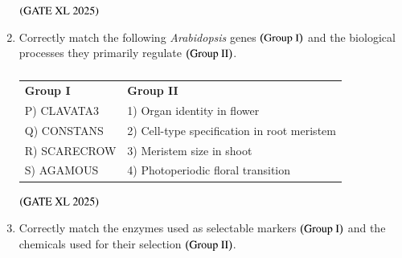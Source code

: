 \documentclass[journal]{IEEEtran}
\begin{document}
\begin{enumerate}
    \hfill $\left(\text{GATE XL 2025}\right)$
    \begin{enumerate}
    \end{enumerate}

    \item Correctly match the following \textit{Arabidopsis} genes $\left(\text{Group I}\right)$ and the biological processes they primarily regulate $\left(\text{Group II}\right)$.

    \begin{table}[H]
        \centering
        \begin{tabular}{ll}
            \textbf{Group I} & \textbf{Group II} \\
            P) CLAVATA3   & 1) Organ identity in flower \\
            Q) CONSTANS   & 2) Cell-type specification in root meristem \\
            R) SCARECROW  & 3) Meristem size in shoot \\
            S) AGAMOUS    & 4) Photoperiodic floral transition \\
        \end{tabular}
        \caption*{}
        \label{tab:xl2025_q60}
    \end{table}

    \hfill $\left(\text{GATE XL 2025}\right)$
    \begin{enumerate}
    \end{enumerate}

    \item Correctly match the enzymes used as selectable markers $\left(\text{Group I}\right)$ and the chemicals used for their selection $\left(\text{Group II}\right)$.


\end{enumerate}
\end{document}

